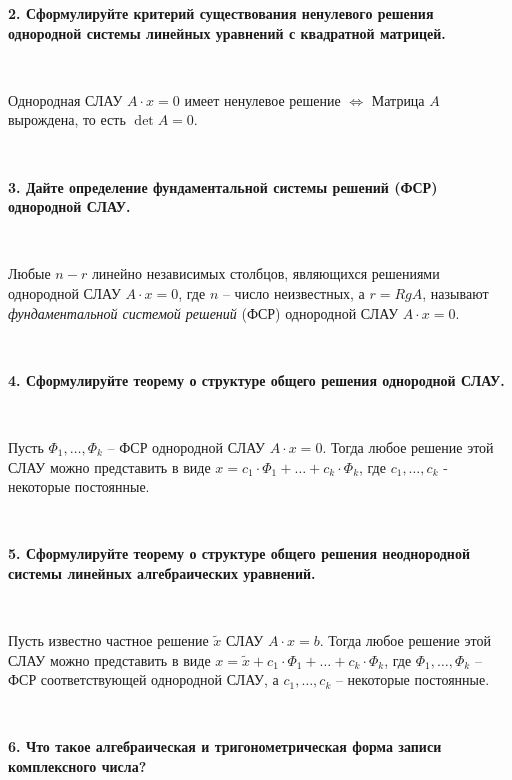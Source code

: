 \documentclass{article}
\begin{document}
	\textbf{2. Сформулируйте критерий существования ненулевого решения однородной системы линейных уравнений с квадратной матрицей.} 
	
	{
		$\;$
		\setlength{\parindent}{0.4cm}
		\hangindent=0.4cm
		
		Однородная СЛАУ $A\cdot x=0$ имеет ненулевое решение $\Leftrightarrow$ Матрица $A$ вырождена, то есть $\det A=0$.
		
		$\;$
		\setlength{\parindent}{0cm}
		\hangindent=0cm
	}
	
	\textbf{3. Дайте определение фундаментальной системы решений (ФСР) однородной СЛАУ.}
	
	{
		$\;$
		\setlength{\parindent}{0.4cm}
		\hangindent=0.4cm
		
		Любые $n-r$ линейно независимых столбцов, являющихся решениями однородной СЛАУ $A\cdot x=0$, где $n$ -- число неизвестных, а $r=RgA$, называют \textit{фундаментальной системой решений} (ФСР) однородной СЛАУ $A\cdot x=0$.
		
		$\;$
		\setlength{\parindent}{0cm}
		\hangindent=0cm
	}
	
	\textbf{4. Сформулируйте теорему о структуре общего решения однородной СЛАУ.}
	
	{
		$\;$
		\setlength{\parindent}{0.4cm}
		\hangindent=0.4cm
		
		 Пусть $\Phi_1, \ldots, \Phi_k$ -- ФСР однородной СЛАУ $A\cdot x=0$. Тогда любое решение этой СЛАУ можно представить в виде
		$x=c_1\cdot\Phi_1+\ldots+c_k\cdot\Phi_k$, где $c_1,\ldots, c_k$ - некоторые постоянные.
		
		$\;$
		\setlength{\parindent}{0cm}
		\hangindent=0cm
	}
	
	\textbf{5. Сформулируйте теорему о структуре общего решения неоднородной системы линейных алгебраических уравнений.} 
	
	{
		$\;$
		\setlength{\parindent}{0.4cm}
		\hangindent=0.4cm
		
		Пусть известно частное решение $\tilde x$ СЛАУ $A\cdot x=b$. Тогда любое решение этой СЛАУ можно 
		представить в виде $x=\tilde x+c_1\cdot\Phi_1+\ldots+c_k\cdot\Phi_k$, где $\Phi_1,\ldots, \Phi_k$ -- ФСР соответствующей однородной СЛАУ, а $c_1, \ldots, c_k$ -- некоторые постоянные.
		
		$\;$
		\setlength{\parindent}{0cm}
		\hangindent=0cm
	}
	
	\textbf{6. Что такое алгебраическая и тригонометрическая форма записи комплексного числа?}
	
\end{document}
